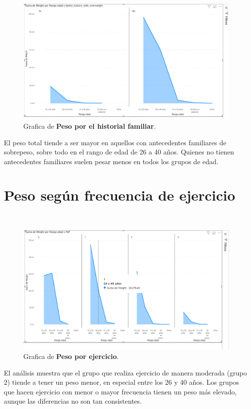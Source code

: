 \documentclass[a4paper]{report} %
\begin{document}
\paragraph{}\mbox{} \\
\begin{figure}[htb]
                \centering
                  \includegraphics[width=\textwidth]{Images/pesoporhistoriafamiliar.png}
                  \caption{Grafica de \textbf{Peso por el historial familiar}.}
              \end{figure} 
El peso total tiende a ser mayor en aquellos con antecedentes familiares de sobrepeso, sobre todo en el rango de edad de 26 a 40 años. Quienes no tienen antecedentes familiares suelen pesar menos en todos los grupos de edad.
\section{Peso según frecuencia de ejercicio}
\paragraph{}\mbox{} \\
\begin{figure}[htb]
                \centering
                  \includegraphics[width=\textwidth]{Images/pesoporejercicio.png}
                  \caption{Grafica de \textbf{Peso por ejercicio}.}
              \end{figure} 
El análisis muestra que el grupo que realiza ejercicio de manera moderada (grupo 2) tiende a tener un peso menor, en especial entre los 26 y 40 años. Los grupos que hacen ejercicio con menor o mayor frecuencia tienen un peso más elevado, aunque las diferencias no son tan consistentes.
\end{document}

